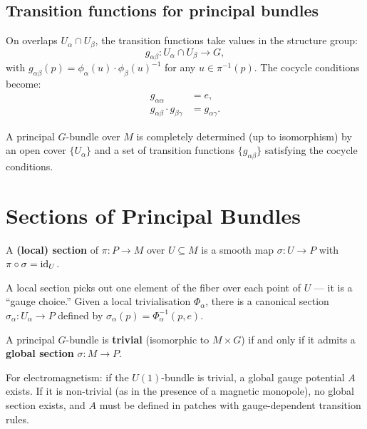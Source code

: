 \subsection{Transition functions for principal bundles}

On overlaps $U_\alpha \cap U_\beta$, the transition functions take values in the structure group:
\begin{equation}
g_{\alpha\beta}: U_\alpha \cap U_\beta \to G,
\end{equation}
with $g_{\alpha\beta}(p) = \phi_\alpha(u) \cdot \phi_\beta(u)^{-1}$ for any $u \in \pi^{-1}(p)$. The cocycle conditions become:
\begin{align}
g_{\alpha\alpha} &= e, \\
g_{\alpha\beta} \cdot g_{\beta\gamma} &= g_{\alpha\gamma}.
\end{align}

\begin{theorem}[Reconstruction]
A principal $G$-bundle over $M$ is completely determined (up to isomorphism) by an open cover $\{U_\alpha\}$ and a set of transition functions $\{g_{\alpha\beta}\}$ satisfying the cocycle conditions.
\end{theorem}

\section{Sections of Principal Bundles}

\begin{definition}[Section]
A \textbf{(local) section} of $\pi: P \to M$ over $U \subseteq M$ is a smooth map $\sigma: U \to P$ with $\pi \circ \sigma = \mathrm{id}_U$.
\end{definition}

A local section picks out one element of the fiber over each point of $U$ --- it is a ``gauge choice.'' Given a local trivialisation $\Phi_\alpha$, there is a canonical section $\sigma_\alpha: U_\alpha \to P$ defined by $\sigma_\alpha(p) = \Phi_\alpha^{-1}(p, e)$.

\begin{proposition}
A principal $G$-bundle is \textbf{trivial} (isomorphic to $M \times G$) if and only if it admits a \textbf{global section} $\sigma: M \to P$.
\end{proposition}

For electromagnetism: if the $U(1)$-bundle is trivial, a global gauge potential $A$ exists. If it is non-trivial (as in the presence of a magnetic monopole), no global section exists, and $A$ must be defined in patches with gauge-dependent transition rules.

